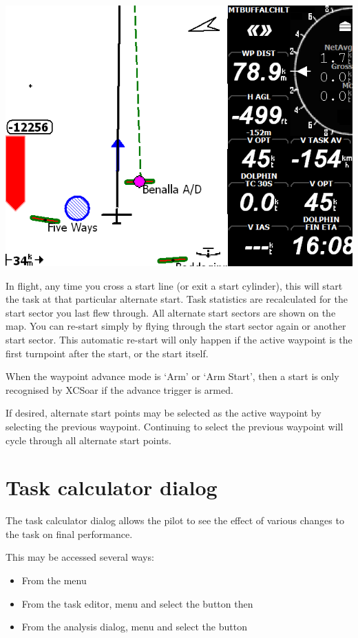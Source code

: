 \documentclass[a4paper,12pt]{refrep}
\begin{document}
\begin{center}
\includegraphics[angle=0,width=\linewidth,keepaspectratio='true']{figures/dialog-startpoint4.png}
\end{center}

  In flight, any time you cross a start line (or exit a start
  cylinder), this will start the task at that particular alternate
  start.  Task statistics are recalculated for the start sector you
  last flew through.  All alternate start sectors are shown on the
  map.  You can re-start simply by flying through the start sector
  again or another start sector.  This automatic re-start will only
  happen if the active waypoint is the first turnpoint after the
  start, or the start itself.

  When the waypoint advance mode is `Arm' or `Arm Start', then a start
  is only recognised by XCSoar if the advance trigger is armed.

  If desired, alternate start points may be selected as the active
  waypoint by selecting the previous waypoint.  Continuing to select
  the previous waypoint will cycle through all alternate start points.

\section{Task calculator dialog}\label{sec:task-calc-dial}
The task calculator dialog allows the pilot to see the effect of
various changes to the task on final performance.

This may be accessed several ways:
\begin{itemize}
\item From the menu 
\begin{quote}
\blink{}
\end{quote}
\item From the task editor, menu \blink{} and select
 the button  then 
\item From the analysis dialog, menu \blink{} and select
 the button 
\end{itemize}
\end{document}
